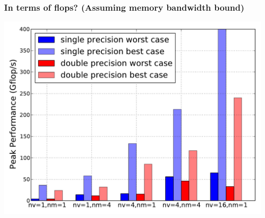 \documentclass{beamer}
\begin{document}
\begin{frame}
\begin{columns}
  \end{columns}

\end{frame}

\begin{frame}
  \frametitle{In terms of flops? (Assuming memory bandwidth bound)}

  \includegraphics[width=.9\linewidth]{slides-figures/ICS-figures/gflops_peak.pdf}

\end{frame}
\end{document}
